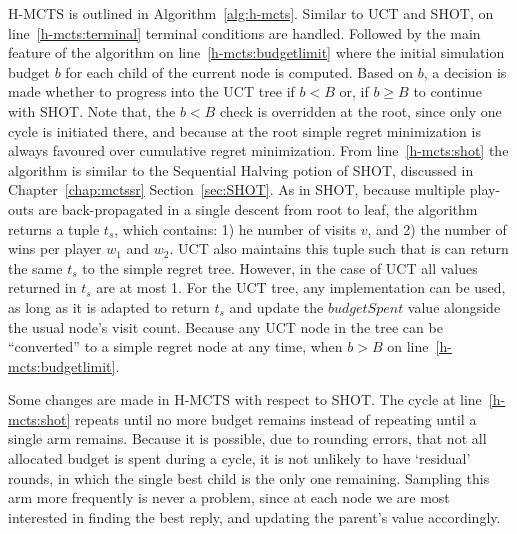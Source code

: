 \documentclass{kecsmstr}
\begin{document}
H-MCTS is outlined in Algorithm~\ref{alg:h-mcts}. Similar to UCT and SHOT, on line~\ref{h-mcts:terminal} terminal conditions are handled. Followed by the main feature of the algorithm on line~\ref{h-mcts:budgetlimit} where the initial simulation budget $b$ for each child of the current node is computed. Based on $b$, a decision is made whether to progress into the UCT tree if $b<B$ or, if $b \geq B$ to continue with SHOT. Note that, the $b<B$ check is overridden at the root, since only one cycle is initiated there, and because at the root simple regret minimization is always favoured over cumulative regret minimization. From line~\ref{h-mcts:shot} the algorithm is similar to the Sequential Halving potion of SHOT, discussed in Chapter~\ref{chap:mctssr} Section~\ref{sec:SHOT}. As in SHOT, because multiple play-outs are back-propagated in a single descent from root to leaf, the algorithm returns a tuple $t_s$, which contains: 1) he number of visits $v$, and 2) the number of wins per player $w_1$ and $w_2$. UCT also maintains this tuple such that is can return the same $t_s$ to the simple regret tree. However, in the case of UCT all values returned in $t_s$ are at most 1. For the UCT tree, any implementation can be used, as long as it is adapted to return $t_s$ and update the $budgetSpent$ value alongside the usual node's visit count. Because any UCT node in the tree can be ``converted'' to a simple regret node at any time, when $b>B$ on line~\ref{h-mcts:budgetlimit}. 

Some changes are made in H-MCTS with respect to SHOT. The cycle at line~\ref{h-mcts:shot} repeats until no more budget remains instead of repeating until a single arm remains. Because it is possible, due to rounding errors, that not all allocated budget is spent during a cycle, it is not unlikely to have `residual' rounds, in which the single best child is the only one remaining. Sampling this arm more frequently is never a problem, since at each node we are most interested in finding the best reply, and updating the parent's value accordingly.
\end{document}

